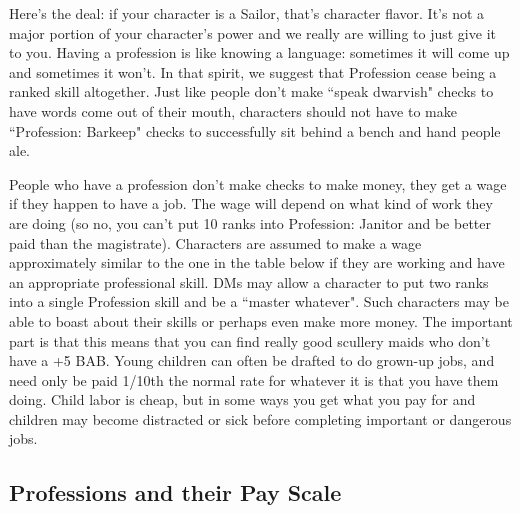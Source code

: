 Here's the deal: if your character is a Sailor, that's character flavor. It's not a major portion of your character's power and we really are willing to just give it to you. Having a profession is like knowing a language: sometimes it will come up and sometimes it won't. In that spirit, we suggest that Profession cease being a ranked skill altogether. Just like people don't make ``speak dwarvish" checks to have words come out of their mouth, characters should not have to make ``Profession: Barkeep" checks to successfully sit behind a bench and hand people ale.

People who have a profession don't make checks to make money, they get a wage if they happen to have a job. The wage will depend on what kind of work they are doing (so no, you can't put 10 ranks into Profession: Janitor and be better paid than the magistrate). Characters are assumed to make a wage approximately similar to the one in the table below if they are working and have an appropriate professional skill. DMs may allow a character to put two ranks into a single Profession skill and be a ``master whatever".  Such characters may be able to boast about their skills or perhaps even make more money. The important part is that this means that you can find really good scullery maids who don't have a +5 BAB. Young children can often be drafted to do grown-up jobs, and need only be paid 1/10th the normal rate for whatever it is that you have them doing. Child labor is cheap, but in some ways you get what you pay for and children may become distracted or sick before completing important or dangerous jobs.

\subsection{Professions and their Pay Scale}



